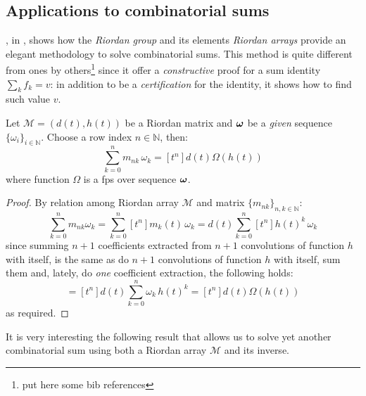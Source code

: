 

\subsection{Applications to combinatorial sums}

\citeauthor{sprugnoli:1991}, in \cite{sprugnoli:1991}, shows how the
\emph{Riordan group} and its elements \emph{Riordan arrays} provide an elegant
methodology to solve combinatorial sums. This method is quite different from
ones by others\footnote{put here some bib references} since it offer a
\emph{constructive} proof for a sum identity $\sum_{k}f_{k}=v$: in addition to
be a \emph{certification} for the identity, it shows how to find such value
$v$.

\begin{theorem}[Sprugnoli]
    Let $\mathcal{M}=(d(t),h(t))$ be a Riordan matrix and $\boldsymbol{\omega}$ 
    be a \emph{given} sequence $\lbrace\omega_{i}\rbrace_{i\in\mathbb{N}}$. Choose
    a row index $n\in\mathbb{N}$, then:
    \begin{displaymath}
        \sum_{k=0}^{n}{m_{nk}\,\omega_{k}}=[t^{n}]d(t)\Omega(h(t))
    \end{displaymath}
    where function $\Omega$ is a \ac{fps} over sequence $\boldsymbol{\omega}$.
    \label{thm:sprugnoli:riordan:combinatorial:sums}
\end{theorem}

\begin{proof}
    By relation among Riordan array $\mathcal{M}$ and matrix 
    $\lbrace m_{nk}\rbrace_{n,k\in\mathbb{N}}$:
    \begin{displaymath}
        \sum_{k=0}^{n}{m_{nk}\omega_{k}}
            =\sum_{k=0}^{n}{[t^{n}]m_{k}(t)\,\omega_{k}}
            =d(t)\sum_{k=0}^{n}{[t^{n}]h(t)^{k}\,\omega_{k}}
    \end{displaymath}
    since summing $n+1$ coefficients extracted from $n+1$
    convolutions of function $h$ with itself, is the same as
    do $n+1$ convolutions of function $h$ with itself, sum them
    and, lately, do \emph{one} coefficient extraction, the following holds:
    \begin{displaymath}
        =[t^{n}]d(t)\sum_{k=0}^{n}{\omega_{k}\,h(t)^{k}}
        =[t^{n}]d(t)\Omega(h(t))
    \end{displaymath}
    as required.
\end{proof}

It is very interesting the following result that allows us to solve
yet another combinatorial sum using both a Riordan array $\mathcal{M}$
and its inverse.

